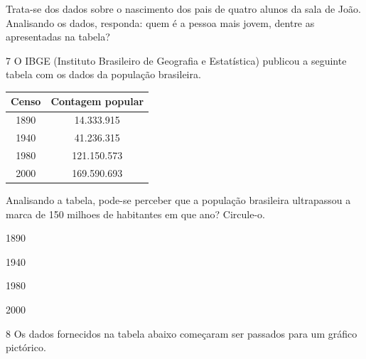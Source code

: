 Trata-se dos dados sobre o nascimento dos pais de quatro alunos da sala
de João. Analisando os dados, responda: quem é a pessoa mais jovem,
dentre as apresentadas na tabela?


\num{7} O IBGE (Instituto Brasileiro de Geografia e Estatística) publicou a
seguinte tabela com os dados da população brasileira.

\begin{tabular}{c|c}
\hline
\multicolumn{1}{l|}{Censo} & \multicolumn{1}{l}{Contagem popular} \\ \hline
1890 & 14.333.915 \\ \hline
1940 & 41.236.315 \\ \hline
1980 & 121.150.573 \\ \hline
2000 & 169.590.693 \\ \hline
\end{tabular}

Analisando a tabela, pode-se perceber que a população brasileira
ultrapassou a marca de 150 milhoes de habitantes em que ano? Circule-o.

\begin{escolha}
\item
  1890
\item
  1940
\item
  1980
\item
  2000
\end{escolha}


\num{8} Os dados fornecidos na tabela abaixo começaram ser passados para um
gráfico pictórico.

